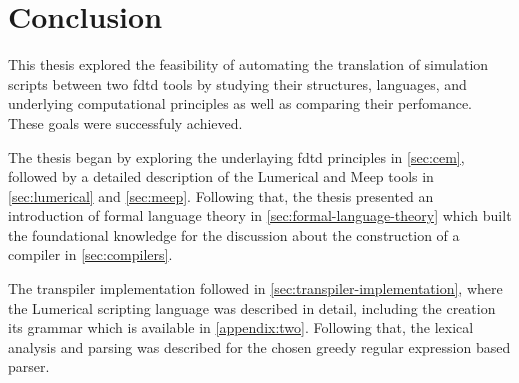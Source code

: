\chapter{Conclusion}
This thesis explored the feasibility of automating the translation of simulation scripts between two \gls{fdtd} tools by studying their structures, languages, and underlying computational principles as well as comparing their perfomance. These goals were successfuly achieved. 


The thesis began by exploring the underlaying \gls{fdtd} principles in \cref{sec:cem}, followed by a detailed description of the Lumerical and Meep tools in \cref{sec:lumerical} and \cref{sec:meep}. Following that, the thesis presented an introduction of formal language theory in \cref{sec:formal-language-theory} which built the foundational knowledge for the discussion about the construction of a compiler in \cref{sec:compilers}.


The transpiler implementation followed in \cref{sec:transpiler-implementation}, where the Lumerical scripting language was described in detail, including the creation its grammar which is available in \cref{appendix:two}. Following that, the lexical analysis and parsing was described for the chosen greedy regular expression based parser. 



